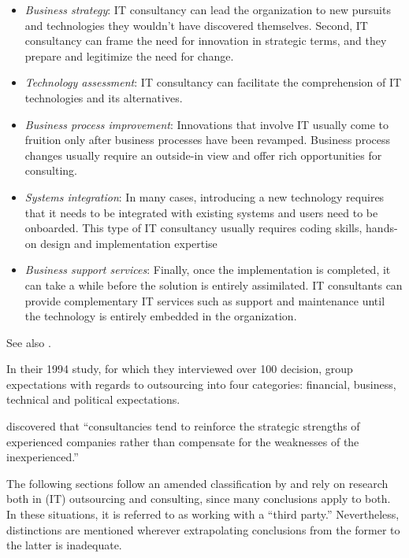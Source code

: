 \documentclass[12pt]{article}
\providecommand{\tightlist}{%
  \setlength{\itemsep}{0pt}\setlength{\parskip}{0pt}}
\begin{document}
\begin{itemize}
\tightlist
\item
  \emph{Business strategy}: IT consultancy can lead the organization to
  new pursuits and technologies they wouldn't have discovered
  themselves. Second, IT consultancy can frame the need for innovation
  in strategic terms, and they prepare and legitimize the need for
  change.
\item
  \emph{Technology assessment}: IT consultancy can facilitate the
  comprehension of IT technologies and its alternatives.
\item
  \emph{Business process improvement}: Innovations that involve IT
  usually come to fruition only after business processes have been
  revamped. Business process changes usually require an outside-in view
  and offer rich opportunities for consulting.
\item
  \emph{Systems integration}: In many cases, introducing a new
  technology requires that it needs to be integrated with existing
  systems and users need to be onboarded. This type of IT consultancy
  usually requires coding skills, hands-on design and implementation
  expertise
\item
  \emph{Business support services}: Finally, once the implementation is
  completed, it can take a while before the solution is entirely
  assimilated. IT consultants can provide complementary IT services such
  as support and maintenance until the technology is entirely embedded
  in the organization.
\end{itemize}

See also \citep{bessant1995}.

In their 1994 study, for which they interviewed over 100 decision,
\citet[10-17]{lacity1994} group expectations with regards to outsourcing
into four categories: financial, business, technical and political
expectations.

\citet[656]{wood1996} discovered that ``consultancies tend to reinforce
the strategic strengths of experienced companies rather than compensate
for the weaknesses of the inexperienced.''

The following sections follow an amended classification by
\citet{lacity1994} and rely on research both in (IT) outsourcing and
consulting, since many conclusions apply to both. In these situations,
it is referred to as working with a ``third party.'' Nevertheless,
distinctions are mentioned wherever extrapolating conclusions from the
former to the latter is inadequate.
\end{document}

